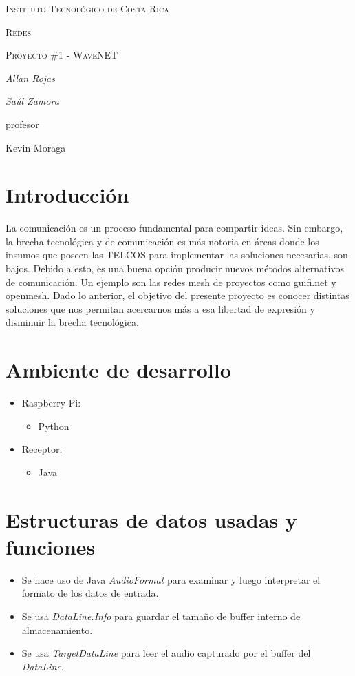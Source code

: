 \documentclass{article}
\begin{document}
\begin{titlepage}
  \centering
  {\scshape\LARGE Instituto Tecnol\'ogico de Costa Rica \par}
  \vspace{1cm}
  {\scshape\Large Redes\par}
  {\scshape\Large Proyecto \#1 - WaveNET\par}
  \vspace{1.5cm}
  {\Large\itshape Allan Rojas\par}
  {\Large\itshape Sa\'ul Zamora\par}
  \vfill
  profesor\par
  Kevin Moraga \textsc{}

  \vfill

\end{titlepage}

\section{Introducci\'on}
La comunicaci\'on es un proceso fundamental para compartir ideas. Sin embargo, la brecha tecnol\'ogica y de comunicaci\'on es m\'as notoria en \'areas donde los insumos que poseen las TELCOS para implementar las soluciones necesarias, son bajos.
Debido a esto, es una buena opci\'on producir nuevos m\'etodos alternativos de comunicaci\'on. Un ejemplo son las redes mesh de proyectos como guifi.net y openmesh.
Dado lo anterior, el objetivo del presente proyecto es conocer distintas soluciones que nos permitan acercarnos m\'as a esa libertad de expresi\'on y disminuir la brecha tecnol\'ogica.

\section{Ambiente de desarrollo}
\begin{itemize}
  \item Raspberry Pi:
  \begin{itemize}
    \item Python
  \end{itemize}
  \item Receptor:
  \begin{itemize}
    \item Java
  \end{itemize}
\end{itemize}

\section{Estructuras de datos usadas y funciones}
\begin{itemize}
  \item Se hace uso de Java \emph{AudioFormat} para examinar y luego interpretar el formato de los datos de entrada.
  \item Se usa \emph{DataLine.Info} para guardar el tama\~no de buffer interno de almacenamiento.
  \item Se usa \emph{TargetDataLine} para leer el audio capturado por el buffer del \emph{DataLine}.
\end{itemize}
\end{document}
